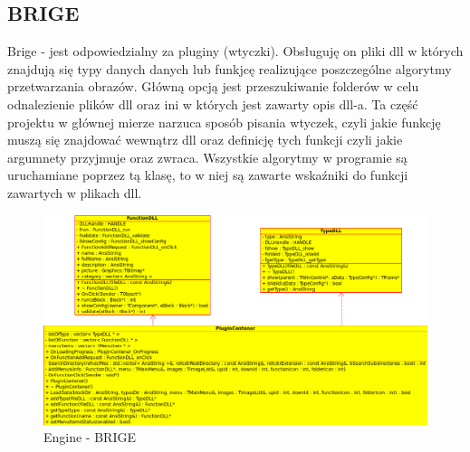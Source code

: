 \subsection{BRIGE}
Brige - jest odpowiedzialny za pluginy (wtyczki). Obsługuję on pliki dll w których znajdują się typy danych danych lub funkjcę realizujące poszczególne algorytmy przetwarzania obrazów.
Główną opcją jest przeszukiwanie folderów w celu odnalezienie plików dll oraz ini w których jest zawarty opis dll-a. Ta część projektu w głównej mierze narzuca sposób pisania wtyczek, czyli jakie funkcję muszą się znajdować wewnątrz dll oraz definicję tych funkcji czyli jakie argumnety przyjmuje oraz zwraca. Wszystkie algorytmy w programie są uruchamiane poprzez tą klasę,
to w niej są zawarte wskaźniki do funkcji zawartych w plikach dll.
\begin{figure}[h]
 \centering
 \includegraphics[scale=0.4]{diagram-brige.png}
 \caption{Engine - BRIGE}
 \label{fig:brige}
\end{figure}
\newpage
